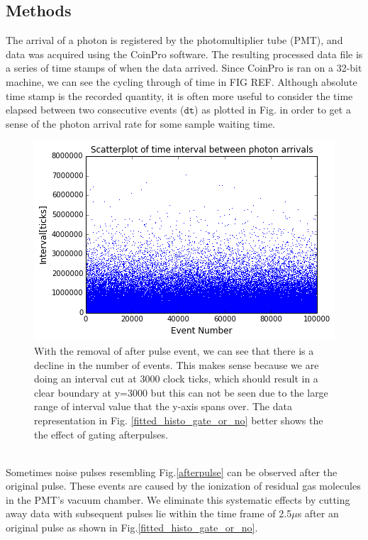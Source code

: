 \documentclass[12pt]{article}
\begin{document}
	\subsection{Methods}
\indent The arrival of a photon is registered by the photomultiplier tube (PMT), and data was acquired using the CoinPro software. The resulting processed data file is a series of time stamps of when the data arrived. Since CoinPro is ran on a 32-bit machine, we can see the cycling through of time in FIG REF. Although absolute time stamp is the recorded quantity, it is often more useful to consider the time elapsed between two consecutive events ($\texttt{dt}$) as plotted in Fig. in order to get a sense of  the photon arrival rate for some sample waiting time.
\begin{figure}[h]
\centering
\includegraphics[width=1\textwidth]{figures/interval_scatterplot}
\caption{With the removal of after pulse event, we can see that there is a decline in the number of events. This makes sense because we are doing an interval cut at 3000 clock ticks, which should result in a clear boundary at y=3000 but this can not be seen due to the large range of interval value that the y-axis spans over. The data representation in Fig. \ref{fitted_histo_gate_or_no} better shows the the effect of gating afterpulses. }
\label{scatterplot}
\end{figure}
\\
\indent Sometimes noise pulses resembling Fig.\ref{afterpulse} can be observed after the original pulse. These events are caused by  the ionization of residual gas molecules in the PMT's vacuum chamber.  We eliminate this systematic effects by cutting away data with subsequent pulses lie within the time frame of 2.5$\mu$s  after an original pulse as shown in Fig.\ref{fitted_histo_gate_or_no}.
\end{document}
